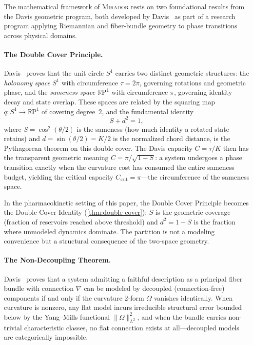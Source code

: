 \documentclass[11pt]{article}
\theoremstyle{plain}
\theoremstyle{definition}
\newcommand{\mirador}{\textsc{Mirador}}
\begin{document}
The mathematical framework of \mirador{} rests on two foundational
results from the Davis geometric program, both developed by
Davis~\cite{DavisDoubleCover,DavisNonDecoupling} as part of a
research program applying Riemannian and fiber-bundle geometry to
phase transitions across physical domains.

\paragraph{The Double Cover Principle.}
Davis~\cite{DavisDoubleCover} proves that the unit circle $S^1$
carries two distinct geometric structures: the \emph{holonomy
space} $S^1$ with circumference $\tau = 2\pi$, governing
rotations and geometric phase, and the \emph{sameness space}
$\mathbb{R}\mathrm{P}^1$ with circumference $\pi$, governing
identity decay and state overlap. These spaces are related by the
squaring map $q \colon S^1 \to \mathbb{R}\mathrm{P}^1$ of covering
degree~$2$, and the fundamental identity
\begin{equation}
  \label{eq:dc-foundation}
  S + d^2 = 1,
\end{equation}
where $S = \cos^2(\theta/2)$ is the sameness (how much identity a
rotated state retains) and $d = \sin(\theta/2) = K/2$ is the
normalized chord distance, is the Pythagorean theorem on this
double cover. The Davis capacity $C = \tau/K$ then has the
transparent geometric meaning $C = \pi/\sqrt{1-S}$: a system
undergoes a phase transition exactly when the curvature cost has
consumed the entire sameness budget, yielding the critical capacity
$C_{\mathrm{crit}} = \pi$---the circumference of the sameness
space.

In the pharmacokinetic setting of this paper, the Double Cover
Principle becomes the Double Cover Identity
(\cref{thm:double-cover}): $S$ is the geometric coverage
(fraction of reservoirs reached above threshold) and $d^2 = 1-S$
is the fraction where unmodeled dynamics dominate. The partition
is not a modeling convenience but a structural consequence of the
two-space geometry.

\paragraph{The Non-Decoupling Theorem.}
Davis~\cite{DavisNonDecoupling} proves that a system admitting a
faithful description as a principal fiber bundle with connection
$\nabla$ can be modeled by decoupled (connection-free) components
if and only if the curvature $2$-form $\Omega$ vanishes
identically. When curvature is nonzero, any flat model incurs
irreducible structural error bounded below by the Yang--Mills
functional $\|\Omega\|_{L^2}^2$, and when the bundle carries
non-trivial characteristic classes, no flat connection exists at
all---decoupled models are categorically impossible.
\end{document}
